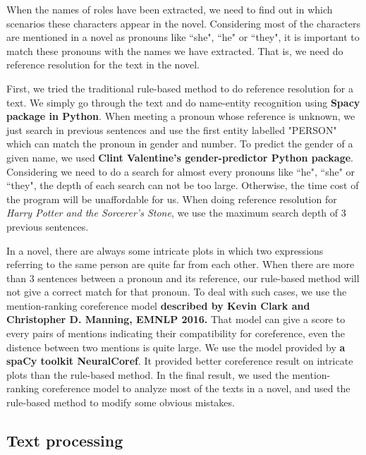 \documentclass[11pt]{article}
\begin{document}
When the names of roles have been extracted, we need to find out in which scenarios these characters appear in the novel. Considering most of the characters are mentioned in a novel as pronouns like ``she", ``he" or ``they", it is important to match these pronouns with the names we have extracted. That is, we need do reference resolution for the text in the novel.

First, we tried the traditional rule-based method to do reference resolution for a text. We simply go through the text and do name-entity recognition using \textbf{Spacy package in Python}. When meeting a pronoun whose reference is unknown, we just search in previous sentences and use the first entity labelled "PERSON" which can match the pronoun in gender and number. To predict the gender of a given name, we used \textbf{Clint Valentine's gender-predictor Python package}. Considering we need to do a search for almost every pronouns like ``he", ``she" or ``they", the depth of each search can not be too large. Otherwise, the time cost of the program will be unaffordable for us. When doing reference resolution for \textit{Harry Potter and the Sorcerer's Stone}, we use the maximum search depth of 3 previous sentences.

In a novel, there are always some intricate plots in which two expressions referring to the same person are quite far from each other. When there are more than 3 sentences between a pronoun and its reference, our rule-based method will not give a correct match for that pronoun. To deal with such cases, we use the mention-ranking coreference model\textbf{ described by Kevin Clark and Christopher D. Manning, EMNLP 2016.} That model can give a score to every pairs of mentions indicating their compatibility for coreference, even the distence between two mentions is quite large. We use the model provided by \textbf{a spaCy toolkit NeuralCoref}. It provided better coreference result on intricate plots than the rule-based method. In the final result, we used the mention-ranking coreference model to analyze most of the texts in a novel, and used the rule-based method to modify some obvious mistakes.


\subsection{Text processing} %
\label{ssec:layout}
\end{document}
